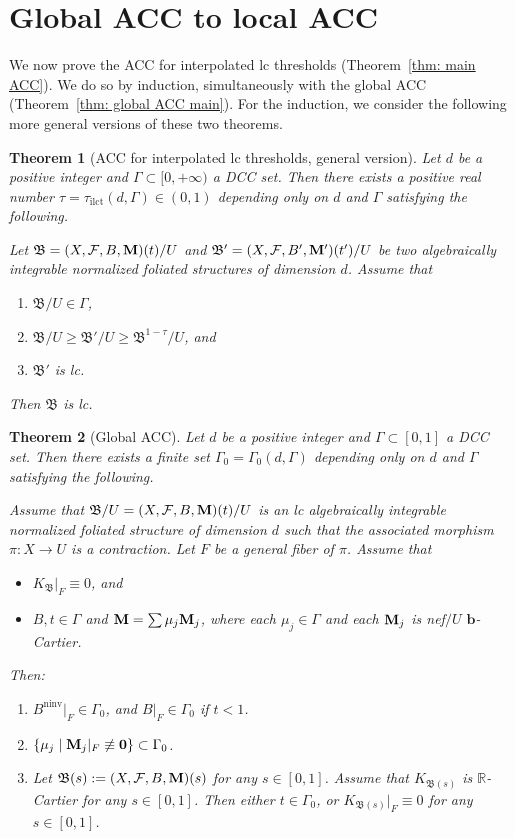 \documentclass[11pt,reqno]{amsart}
\numberwithin{equation}{section}
\newcommand{\bb}{\bm{b}}
\newcommand{\Mm}{{\bf{M}}}
\newcommand{\ninv}{\operatorname{ninv}}
\newcommand{\ilct}{\operatorname{ilct}}
\newcommand{\Bb}{{\mathfrak{B}}}
\newcommand{\Ff}{\mathcal{F}}
\newcommand{\Ii}{\Gamma}
\newtheorem{thm}{Theorem}[section]
\theoremstyle{definition}
\begin{document}
\section{Global ACC to local ACC}\label{sec: global to local}

We now prove the ACC for interpolated lc thresholds (Theorem~\ref{thm: main ACC}). We do so by induction, simultaneously with the global ACC (Theorem~\ref{thm: global ACC main}). For the induction, we consider the following more general versions of these two theorems.

\begin{thm}[ACC for interpolated lc thresholds, general version]\label{thm: acc lct general version}
Let $d$ be a positive integer and $\Ii\subset [0,+\infty)$ a DCC set. Then there exists a positive real number $\tau=\tau_{\ilct}(d,\Ii)\in (0,1)$ depending only on $d$ and $\Ii$ satisfying the following. 

Let $\Bb=(X,\Ff,B,\Mm)(t)/U$ and $\Bb'=(X,\Ff,B',\Mm')(t')/U$ be two algebraically integrable normalized foliated structures of dimension $d$. Assume that
\begin{enumerate}
\item $\Bb/U\in\Ii$,
\item $\Bb/U\geq\Bb'/U\geq\Bb^{1-\tau}/U$, and
\item $\Bb'$ is lc.
\end{enumerate}
Then $\Bb$ is lc.
\end{thm}


\begin{thm}[Global ACC]\label{thm: global acc general}
Let $d$ be a positive integer and $\Ii\subset [0,1]$ a DCC set. Then there exists a finite set $\Ii_0=\Ii_0(d,\Ii)$ depending only on $d$ and $\Ii$ satisfying the following. 

Assume that $\Bb/U=(X,\Ff,B,\Mm)(t)/U$ is an lc algebraically integrable normalized foliated structure of dimension $d$ such that the associated morphism $\pi: X\rightarrow U$ is a contraction. Let $F$ be a general fiber of $\pi$. Assume that
\begin{itemize}
\item $K_{\Bb}|_F\equiv0$, and
\item $B,t\in\Ii$ and $\Mm=\sum\mu_j\Mm_j$, where each $\mu_j\in\Ii$ and each $\Mm_j$ is nef$/U$ $\bb$-Cartier.
\end{itemize}
Then:
\begin{enumerate}
    \item $B^{\ninv}|_F\in\Ii_0$, and $B|_F\in\Ii_0$ if $t<1$.
    \item $\{\mu_j\mid \Mm_j|_{F}\not\equiv\bm{0}\}\subset\Ii_0$.
    \item Let $\Bb(s):=(X,\Ff,B,\Mm)(s)$ for any $s\in [0,1]$. Assume that $K_{\Bb(s)}$ is $\mathbb R$-Cartier for any $s\in [0,1]$. Then either $t\in\Ii_0$, or $K_{\Bb(s)}|_F\equiv 0$ for any $s\in [0,1]$.
\end{enumerate}
\end{thm}
\end{document}
